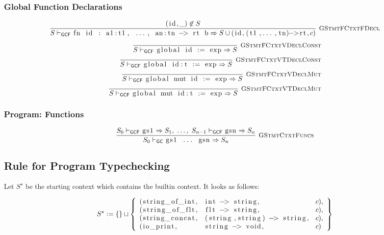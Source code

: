 \documentclass{article}
\newcommand{\code}[1]{\lstinline[columns=fixed]{#1}}
\newcommand{\drmrule}[5]{\frac{#1}{#2\vdash_{\mathsf{#3}}#4}\textsc{\ \small{#5}}}
\newcommand{\ruleapp}[1]{\vdash_{\mathsf{#1}}}
\newcommand{\mc}[1]{\textnormal{\code{#1}}}
\begin{document}
			\subsubsection{Global Function Declarations}
			
				\begin{align*}
					\drmrule{(\mc{id},\_) \not\in S}{S}{GCF}{\mc{fn id : a1:t1, ..., an:tn -> rt b} \Rightarrow S \cup (\mc{id}, \mc{(t1,...,tn)->rt}, c)}{GStmtFCtxtFDecl}
				\end{align*}
				\begin{align*}
					\drmrule{}{S}{GCF}{\mc{global id := exp} \Rightarrow S}{GStmtFCtxtVDeclConst}\\
					\drmrule{}{S}{GCF}{\mc{global id:t := exp} \Rightarrow S}{GStmtFCtxtVTDeclConst}\\
					\drmrule{}{S}{GCF}{\mc{global mut id := exp} \Rightarrow S}{GStmtFCtxtVDeclMut}\\
					\drmrule{}{S}{GCF}{\mc{global mut id:t := exp} \Rightarrow S}{GStmtFCtxtVTDeclMut}
				\end{align*}
			
			\subsubsection{Program: Functions}
			
				\begin{align*}
					\drmrule{S_0 \ruleapp{GCF} \mc{gs1} \Rightarrow S_1,\ \dots,\ S_{n-1} \ruleapp{GCF} \mc{gsn} \Rightarrow S_n}{S_0}{GC}{\mc{gs1 ... gsn} \Rightarrow S_n}{GStmtCtxtFuncs}
				\end{align*}
			
		\subsection{Rule for Program Typechecking}
		
			Let $S^\star$ be the starting context which contains the builtin context. It looks as follows:
			
			\begin{align*}
				S^\star := \{\}\sqcup \left\{
					\begin{array}{lll}
						(\mc{string\_of\_int},&\mc{int -> string},&c),\\ (\mc{string\_of\_flt},&\mc{flt -> string},&c),\\
						(\mc{string\_concat},&\mc{(string,string) -> string},&c),\\
						(\mc{io\_print},&\mc{string -> void},&c)
					\end{array}
				\right\}
			\end{align*}
		
\end{document}

